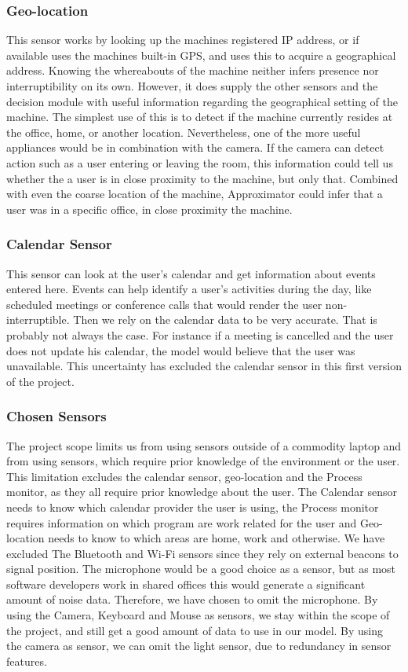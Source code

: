 \documentclass{sigchi}
\begin{document}
\subsubsection{Geo-location}
This sensor works by looking up the machines registered IP address, or if available uses the machines built-in GPS, and uses this to acquire a geographical address.
Knowing the whereabouts of the machine neither infers presence nor interruptibility on its own.
However, it does supply the other sensors and the decision module with useful information regarding the geographical setting of the machine.
The simplest use of this is to detect if the machine currently resides at the office, home, or another location.
Nevertheless, one of the more useful appliances would be in combination with the camera.
If the camera can detect action such as a user entering or leaving the room, this information could tell us whether the a user is in close proximity to the machine, but only that.
Combined with even the coarse location of the machine, Approximator could infer that a user was in a specific office, in close proximity the machine.

\subsubsection{Calendar Sensor}
This sensor can look at the user's calendar and get information about events entered here.
Events can help identify a user's activities during the day, like scheduled meetings or conference calls that would render the user non-interruptible.
Then we rely on the calendar data to be very accurate.
That is probably not always the case. For instance if a meeting is cancelled and the user does not update his calendar, the model would believe that the user was unavailable.
This uncertainty has excluded the calendar sensor in this first version of the project.

\subsubsection{Chosen Sensors}
The project scope limits us from using sensors outside of a commodity laptop and from using sensors, which require prior knowledge of the environment or the user.
This limitation excludes the calendar sensor, geo-location and the Process monitor, as they all require prior knowledge about the user.
The Calendar sensor needs to know which calendar provider the user is using, the Process monitor requires information on which program are work related for the user and Geo-location needs to know to which areas are home, work and otherwise.
We have excluded The Bluetooth and Wi-Fi sensors since they rely on external beacons to signal position.
The microphone would be a good choice as a sensor, but as most software developers work in shared offices this would generate a significant amount of noise data.
Therefore, we have chosen to omit the microphone.
By using the Camera, Keyboard and Mouse as sensors, we stay within the scope of the project, and still get a good amount of data to use in our model.
By using the camera as sensor, we can omit the light sensor, due to redundancy in sensor features.
\end{document}
